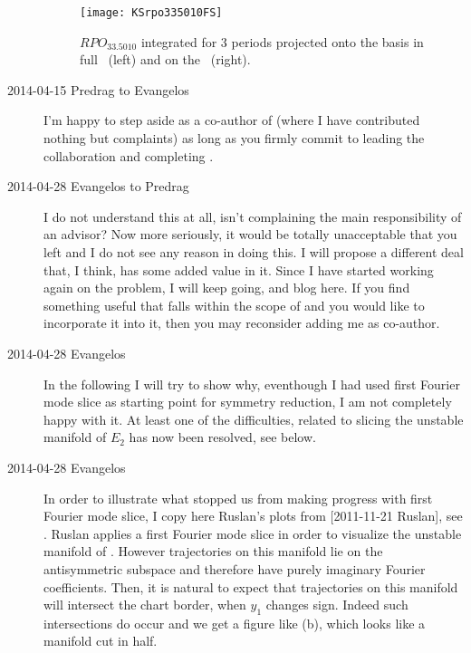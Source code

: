 \begin{description}
\begin{figure}
\begin{center}
 \texttt{[image: KSrpo335010FS]} \,
\end{center}
\caption{ \KS $RPO_{33.5010}$ integrated for 3 periods projected onto
the basis  in full \statesp\ (left) and on the
\slicePlane\ (right).
}
\label{f-KSrpo335010FS}
\end{figure}

\item[2014-04-15 Predrag to Evangelos] I'm happy to step aside as a
co-author of  (where I have contributed nothing but
complaints) as long as you firmly commit to leading the collaboration and
completing .

\item[2014-04-28 Evangelos to Predrag] I do not understand this at all, isn't
complaining the main responsibility of an advisor? Now more seriously, it would
be totally unacceptable that you left  and I do not see
any reason in doing this. I will propose a different deal that, I think, has some
added value in it. Since I have started working again on the problem,
I will keep going, and blog here. If you find something useful that falls
within the scope of  and you would like to incorporate it
into it, then you may reconsider adding me as co-author.

\item[2014-04-28 Evangelos] In the following I will try to show why, eventhough
I had used first Fourier mode slice as starting point for symmetry reduction,
I am not completely happy with it. At least one of the difficulties,
related to slicing the unstable manifold of $E_2$ has now been resolved,
see below.

\item[2014-04-28 Evangelos] In order to illustrate what stopped us from making
progress with first Fourier mode slice, I copy here Ruslan's plots from
[2011-11-21 Ruslan], see .
Ruslan applies a first Fourier mode slice in order to
visualize the unstable manifold of . However trajectories on this
manifold lie on the antisymmetric subspace and therefore have purely imaginary
Fourier coefficients. Then, it is natural to expect that trajectories on this
manifold will intersect the chart border, when $y_1$ changes sign. Indeed such
intersections do occur and we get a figure like (b),
which looks like a manifold cut in half.


\end{description}
